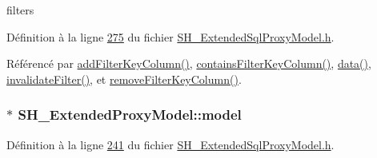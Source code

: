 filters 



Définition à la ligne \hyperlink{SH__ExtendedSqlProxyModel_8h_source_l00275}{275} du fichier \hyperlink{SH__ExtendedSqlProxyModel_8h_source}{S\-H\-\_\-\-Extended\-Sql\-Proxy\-Model.\-h}.



Référencé par \hyperlink{classSH__ExtendedProxyModel_a4e98e24b6b94adf31a2c5e935a48f831}{add\-Filter\-Key\-Column()}, \hyperlink{classSH__ExtendedProxyModel_a865da9bd795526dc63b8c6447d59cfc0}{contains\-Filter\-Key\-Column()}, \hyperlink{classSH__ExtendedProxyModel_afbc947efbe1107fc5bf8926c52902a1c}{data()}, \hyperlink{classSH__ExtendedProxyModel_a012a631fa5724bb8446bc5dce10be767}{invalidate\-Filter()}, et \hyperlink{classSH__ExtendedProxyModel_a99c5fe8ea4e2327003a4810a1d869dac}{remove\-Filter\-Key\-Column()}.

\hypertarget{classSH__ExtendedProxyModel_a8c8b8930c6b1abd9bbb1dce1fdc9690b}{
\subsubsection[{model}]{$\ast$ S\-H\-\_\-\-Extended\-Proxy\-Model\-::model\hspace{0.3cm}{\ttfamily [protected]}}}\label{classSH__ExtendedProxyModel_a8c8b8930c6b1abd9bbb1dce1fdc9690b}


Définition à la ligne \hyperlink{SH__ExtendedSqlProxyModel_8h_source_l00241}{241} du fichier \hyperlink{SH__ExtendedSqlProxyModel_8h_source}{S\-H\-\_\-\-Extended\-Sql\-Proxy\-Model.\-h}.



